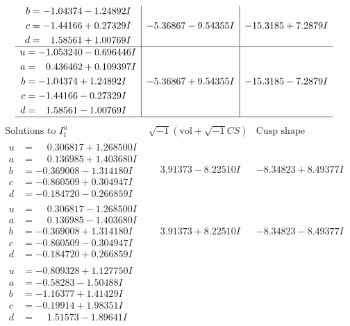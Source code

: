 \documentclass[1p]{elsarticle_modified}
\theoremstyle{definition}
\newcommand{\I}{\sqrt{-1}}
\begin{document}
$$\begin{array}{c|c|c}
\begin{aligned}
b &= -1.04374 - 1.24892 I \\
c &= -1.44166 + 0.27329 I \\
d &= \phantom{-}1.58561 + 1.00769 I\end{aligned}
 & -5.36867 - 9.54355 I & -15.3185 + 7.2879 I \\ \hline\begin{aligned}
u &= -1.053240 - 0.696446 I \\
a &= \phantom{-}0.436462 + 0.109397 I \\
b &= -1.04374 + 1.24892 I \\
c &= -1.44166 - 0.27329 I \\
d &= \phantom{-}1.58561 - 1.00769 I\end{aligned}
 & -5.36867 + 9.54355 I & -15.3185 - 7.2879 I\\
 \hline 
 \end{array}$$\newpage$$\begin{array}{c|c|c}  
\text{Solutions to }I^u_{1}& \I (\text{vol} + \sqrt{-1}CS) & \text{Cusp shape}\\
 \hline 
\begin{aligned}
u &= \phantom{-}0.306817 + 1.268500 I \\
a &= \phantom{-}0.136985 + 1.403680 I \\
b &= -0.369008 - 1.314180 I \\
c &= -0.860509 + 0.304947 I \\
d &= -0.184720 - 0.266859 I\end{aligned}
 & \phantom{-}3.91373 - 8.22510 I & -8.34823 + 8.49377 I \\ \hline\begin{aligned}
u &= \phantom{-}0.306817 - 1.268500 I \\
a &= \phantom{-}0.136985 - 1.403680 I \\
b &= -0.369008 + 1.314180 I \\
c &= -0.860509 - 0.304947 I \\
d &= -0.184720 + 0.266859 I\end{aligned}
 & \phantom{-}3.91373 + 8.22510 I & -8.34823 - 8.49377 I \\ \hline\begin{aligned}
u &= -0.809328 + 1.127750 I \\
a &= -0.58283 - 1.50488 I \\
b &= -1.16377 + 1.41429 I \\
c &= -0.19914 + 1.98351 I \\
d &= \phantom{-}1.51573 - 1.89641 I\end{aligned}

\end{array}$$
\end{document}
